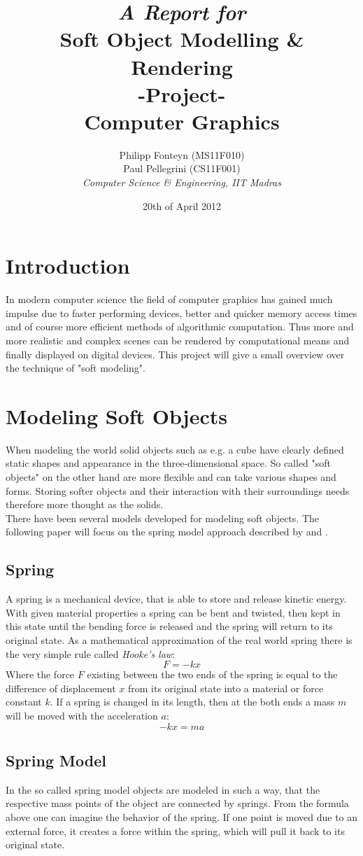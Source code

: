 \documentclass[11pt]{article}
\title{
	\emph{A Report for}\\
	\huge{\textbf{Soft Object Modelling \& Rendering} }\\
	-Project-\\
	Computer Graphics\\[2em]	
}
\author{
	Philipp Fonteyn (MS11F010)\\
	Paul Pellegrini (CS11F001)\\[2em]
	\emph{Computer Science \& Engineering, IIT Madras}
}
\date{20th of April 2012}
\begin{document}
\maketitle
\newpage
\tableofcontents
\newpage

%
%
%
\section{Introduction}
In modern computer science the field of computer graphics has gained much impulse due to faster performing devices, better and quicker memory access times and of course more efficient methods of algorithmic computation. Thus more and more realistic and complex scenes can be rendered by computational means and finally displayed on digital devices. This project will give a small overview over the technique of "soft modeling".
%
%
%
\section{Modeling Soft Objects}
When modeling the world solid objects such as e.g. a cube have clearly defined static shapes and appearance in the three-dimensional space. So called "soft objects" on the other hand are more flexible and can take various shapes and forms. Storing softer objects and their interaction with their surroundings needs therefore more thought as the solids.\\[1em]
%
There have been several models developed for modeling soft objects. The following paper will focus on the spring model approach described by \cite{LSCS} and \cite{hair}\cite{gama}.\\[1em]
%
\subsection{Spring}
A spring is a mechanical device, that is able to store and release kinetic energy. With given material properties a spring can be bent and twisted, then kept in this state until the bending force is released and the spring will return to its original state. As a mathematical approximation of the real world spring there is the very simple rule called \textit{Hooke's law}:
$$F=-kx$$
Where the force $F$ existing between the two ends of the spring is equal to the difference of displacement $x$ from its original state into a material or force constant $k$. If a spring is changed in its length, then at the both ends a mass $m$ will be moved with the acceleration $a$:
$$-kx = ma$$

\subsection{Spring Model}
In the so called spring model objects are modeled in such a way, that the respective mass points of the object are connected by springs. From the formula above one can imagine the behavior of the spring. If one point is moved due to an external force, it creates a force within the spring, which will pull it back to its original state.
\end{document}
